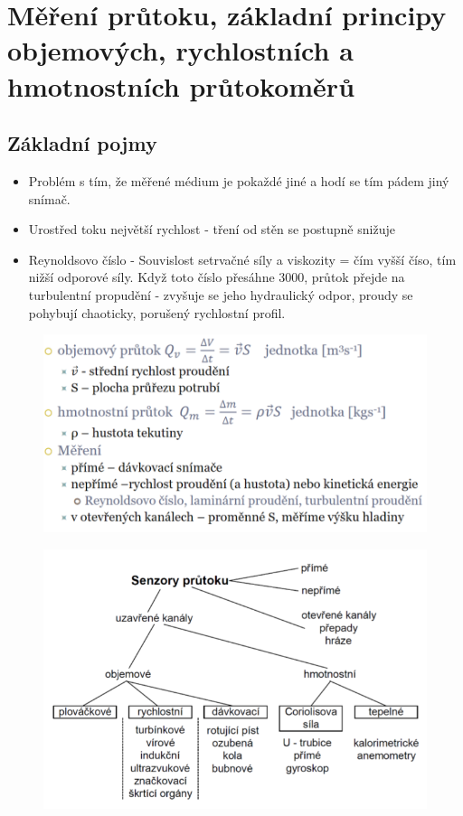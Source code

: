 \section{Měření průtoku, základní principy objemových, rychlostních a hmotnostních průtokoměrů}

\subsection*{Základní pojmy}
\begin{itemize}
    \item Problém s tím, že měřené médium je pokaždé jiné a hodí se tím pádem jiný snímač.
    \item Urostřed toku největší rychlost - tření od stěn se postupně snižuje
    \item Reynoldsovo číslo - Souvislost setrvačné síly a viskozity = čím vyšší číso, tím nižší odporové síly. Když toto číslo přesáhne 3000, průtok přejde na turbulentní propudění - zvyšuje se jeho hydraulický odpor, proudy se pohybují chaoticky, porušený rychlostní profil.
\end{itemize}
\begin{figure}[!h]
    \centering
    \includegraphics[scale = 0.8]{img/prutokZaklad.png}
\end{figure}

\begin{figure}[!h]
    \centering
    \includegraphics[scale = 1]{img/proudoverozdeleni.png}
\end{figure}


